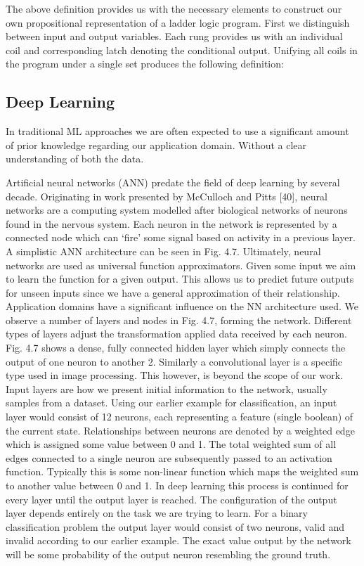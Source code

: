 \documentclass[runningheads]{llncs}
\begin{document}
The above definition provides us with the necessary elements to construct our own
propositional representation of a ladder logic program. First we distinguish between input
and output variables. Each rung provides us with an individual coil and corresponding
latch denoting the conditional output. Unifying all coils in the program under a single set
produces the following definition:


\subsection{Deep Learning}
In traditional ML approaches we are often expected to use a significant amount of
prior knowledge regarding our application domain. Without a clear understanding
of both the data. 

Artificial neural networks (ANN) predate the field of deep learning by several decade.
Originating in work presented by McCulloch and Pitts [40], neural networks are a
computing system modelled after biological networks of neurons found in the nervous
system. Each neuron in the network is represented by a connected node which can
‘fire’ some signal based on activity in a previous layer. A simplistic ANN architecture
can be seen in Fig. 4.7. Ultimately, neural networks are used as universal function
approximators. Given some input we aim to learn the function for a given output.
This allows us to predict future outputs for unseen inputs since we have a general
approximation of their relationship.
Application domains have a significant influence on the NN architecture used. We
observe a number of layers and nodes in Fig. 4.7, forming the network. Different types of
layers adjust the transformation applied data received by each neuron. Fig. 4.7 shows
a dense, fully connected hidden layer which simply connects the output of one neuron
to another 2. Similarly a convolutional layer is a specific type used in image processing.
This however, is beyond the scope of our work. Input layers are how we present initial
information to the network, usually samples from a dataset. Using our earlier example for classification, an input layer would consist of 12 neurons, each representing a feature
(single boolean) of the current state. Relationships between neurons are denoted by a
weighted edge which is assigned some value between 0 and 1. The total weighted sum of
all edges connected to a single neuron are subsequently passed to an activation function.
Typically this is some non-linear function which maps the weighted sum to another value
between 0 and 1. In deep learning this process is continued for every layer until the output
layer is reached. The configuration of the output layer depends entirely on the task we are
trying to learn. For a binary classification problem the output layer would consist of two
neurons, valid and invalid according to our earlier example. The exact value output by the
network will be some probability of the output neuron resembling the ground truth.
\end{document}
